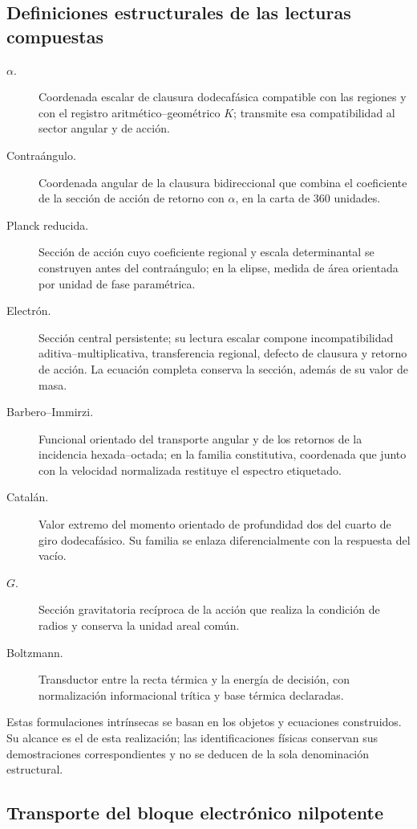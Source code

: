 \subsection{Definiciones estructurales de las lecturas compuestas}
\label{md:compos:definiciones}

\begin{description}
 \item[$\alpha$.] Coordenada escalar de clausura dodecafásica compatible con
 las regiones y con el registro aritmético--geométrico $K$; transmite esa
 compatibilidad al sector angular y de acción.
 \item[Contraángulo.] Coordenada angular de la clausura bidireccional que
 combina el coeficiente de la sección de acción de retorno con $\alpha$,
 en la carta de $360$ unidades.
 \item[Planck reducida.] Sección de acción cuyo coeficiente regional y escala
 determinantal se construyen antes del contraángulo; en la elipse, medida de
 área orientada por unidad de fase paramétrica.
 \item[Electrón.] Sección central persistente; su lectura escalar compone
 incompatibilidad aditiva--multiplicativa, transferencia regional, defecto
 de clausura y retorno de acción. La ecuación completa conserva la sección,
 además de su valor de masa.
 \item[Barbero--Immirzi.] Funcional orientado del transporte angular y de los
 retornos de la incidencia hexada--octada; en la familia constitutiva,
 coordenada que junto con la velocidad normalizada restituye el espectro
 etiquetado.
 \item[Catalán.] Valor extremo del momento orientado de profundidad dos del
 cuarto de giro dodecafásico. Su familia se enlaza diferencialmente con la
 respuesta del vacío.
 \item[$G$.] Sección gravitatoria recíproca de la acción que realiza la
 condición de radios y conserva la unidad areal común.
 \item[Boltzmann.] Transductor entre la recta térmica y la energía de
 decisión, con normalización informacional trítica y base térmica declaradas.
\end{description}
Estas formulaciones intrínsecas se basan en los objetos y ecuaciones
construidos. Su alcance es el de esta realización; las identificaciones
físicas conservan sus demostraciones correspondientes y no se deducen de
la sola denominación estructural.

\subsection{Transporte del bloque electrónico nilpotente}
\label{md:compos:nilpotentes}

